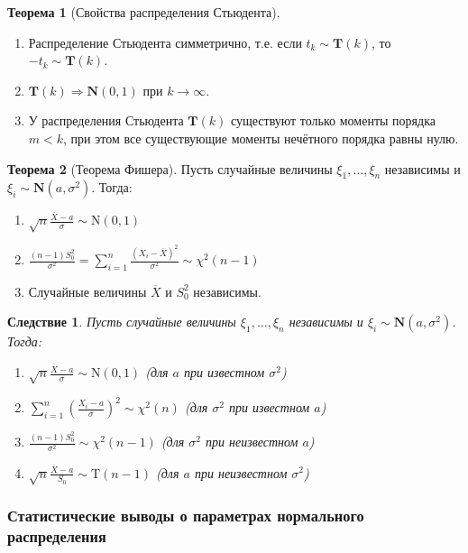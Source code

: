 \documentclass[oneside,final,14pt]{extreport}
\theoremstyle{plain}
\newtheorem*{crlr}{Следствие}
\theoremstyle{definition}
\theoremstyle{named}
\newtheorem*{namedthm}{Теорема}
\begin{document}
\begin{namedthm}[Свойства распределения Стьюдента]\leavevmode
\begin{enumerate}
    \item Распределение Стьюдента симметрично, т.е. если $t_k \sim \mathbf{T}(k)$, то $-t_k \sim \mathbf{T}(k)$.
    \item $\mathbf{T}(k) \Rightarrow \mathbf{N}(0,1)$ при $k \to \infty$.
    \item У распределения Стьюдента $\mathbf{T}(k)$ существуют только моменты порядка $m < k$, при этом все существующие моменты нечётного порядка равны нулю.
\end{enumerate}
\end{namedthm}

\begin{namedthm}[Теорема Фишера]
Пусть случайные величины $\xi_1, \ldots, \xi_n$ независимы и ${\xi_i \sim \mathbf{N}(a,\sigma^{2})}$. Тогда:
\begin{enumerate}
    \item $\sqrt{n} \frac{\overline{X}-a}{\sigma} \sim \mathrm{N}(0,1)$
    \item $\frac{(n-1) S_{0}^{2}}{\sigma^{2}}=\sum\limits_{i=1}^{n} \frac{\left(X_{i}-\overline{X}\right)^{2}}{\sigma^{2}} \sim \chi^{2}(n-1)$
    \item Случайные величины $\overline{X}$ и $S_{0}^{2}$ независимы.
\end{enumerate}
\end{namedthm}
\begin{crlr}
    Пусть случайные величины $\xi_1, \ldots, \xi_n$ независимы и ${\xi_i \sim \mathbf{N}(a,\sigma^{2})}$. Тогда:
    \begin{enumerate}
        \item $\sqrt{n} \frac{\overline{X}-a}{\sigma} \sim \mathrm{N}(0,1)$ (для $a$ при известном $\sigma^{2}$)
        \item $\sum\limits_{i=1}^{n}\left(\frac{X_{i}-a}{\sigma}\right)^{2} \sim \chi^{2}(n)$ (для $\sigma^{2}$ при известном $a$)
        \item $\frac{(n-1) S_{0}^{2}}{\sigma^{2}} \sim \chi^{2}(n-1)$ (для $\sigma^{2}$ при неизвестном $a$)
        \item $\sqrt{n} \frac{\overline{X}-a}{S_{0}} \sim \mathrm{T}(n-1)$ (для $a$ при неизвестном $\sigma^{2}$)
    \end{enumerate}
\end{crlr}

\subsubsection{Статистические выводы о параметрах нормального распределения}
\end{document}
